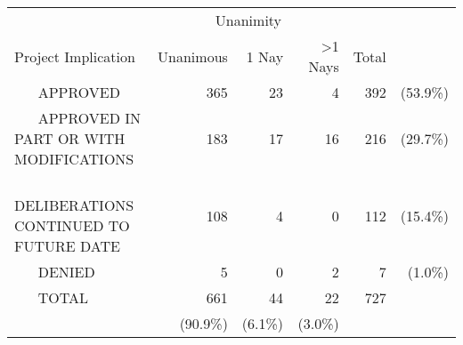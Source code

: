 \begin{tabular}{lrrrrr} \toprule
 & \multicolumn{3}{c}{Unanimity} &  & \\ 
Project Implication & Unanimous & 1 Nay & >1 Nays & Total &  \\ \midrule
~ ~ APPROVED & 365 & 23 & 4 & 392 & (53.9\%) \\ [1ex] 
~ ~ APPROVED IN PART OR WITH MODIFICATIONS & 183 & 17 & 16 & 216 & (29.7\%) \\ [1ex] 
~ ~ DELIBERATIONS CONTINUED TO FUTURE DATE & 108 & 4 & 0 & 112 & (15.4\%) \\ [1ex] 
~ ~ DENIED & 5 & 0 & 2 & 7 & (1.0\%) \\ [1ex] 
~ ~ TOTAL & 661 & 44 & 22 & 727 &  \\ [1ex] 
 & (90.9\%) & (6.1\%) & (3.0\%) &  &  \\ [1ex] 
\bottomrule
\end{tabular}
